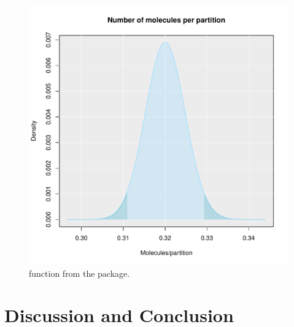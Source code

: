 \begin{figure}[htbp]
  \centering
  \includegraphics[clip=true, width=14cm]{figures/dpcR.pdf}
  \caption{ function from the  package.}
  \label{figure:dpcR}
\end{figure}

\section{Discussion and Conclusion}

